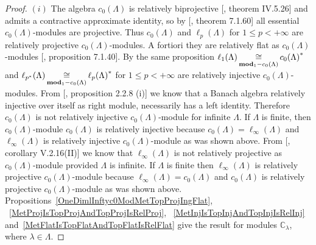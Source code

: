 \begin{proof} $(i)$ The algebra $c_0(\Lambda)$ is relatively biprojective
[\cite{HelHomolBanTopAlg}, theorem IV.5.26] and admits a contractive approximate
identity, so by [\cite{HelBanLocConvAlg}, theorem 7.1.60] all essential
$c_0(\Lambda)$-modules are projective. Thus $c_0(\Lambda)$ and $\ell_p(\Lambda)$
for $1\leq p<+\infty$ are relatively projective $c_0(\Lambda)$-modules. A
fortiori they are relatively flat as $c_0(\Lambda)$-modules
[\cite{HelBanLocConvAlg}, proposition 7.1.40]. By the same proposition
$\ell_1(\Lambda)\mathop{\mathbin{\cong}}\limits_{\mathbf{mod}_1-c_0(\Lambda)}{c_0(\Lambda)}^*$ and
$\ell_{p^*}(\Lambda)\mathop{\mathbin{\cong}}\limits_{\mathbf{mod}_1-c_0(\Lambda)}{\ell_p(\Lambda)}^*$ for
$1\leq p<+\infty$ are relatively injective $c_0(\Lambda)$-modules. From
[\cite{RamsHomPropSemgroupAlg}, proposition 2.2.8 (i)] we know that a Banach
algebra relatively injective over itself as right module, necessarily has a left
identity. Therefore $c_0(\Lambda)$ is not relatively injective
$c_0(\Lambda)$-module for infinite $\Lambda$. If $\Lambda$ is finite, then
$c_0(\Lambda)$-module $c_0(\Lambda)$ is relatively injective because
$c_0(\Lambda)=\ell_\infty(\Lambda)$ and $\ell_\infty(\Lambda)$ is relatively
injective $c_0(\Lambda)$-module as was shown above. From
[\cite{HelHomolBanTopAlg}, corollary V.2.16(II)] we know that
$\ell_\infty(\Lambda)$ is not relatively projective as $c_0(\Lambda)$-module
provided $\Lambda$ is infinite. If $\Lambda$ is finite then
$\ell_\infty(\Lambda)$ is relatively projective $c_0(\Lambda)$-module because
$\ell_\infty(\Lambda)=c_0(\Lambda)$ and $c_0(\Lambda)$ is relatively projective
$c_0(\Lambda)$-module as was shown above.
Propositions~\ref{OneDimlInftyc0ModMetTopProjIngFlat},
~\ref{MetProjIsTopProjAndTopProjIsRelProj},
~\ref{MetInjIsTopInjAndTopInjIsRelInj}
and~\ref{MetFlatIsTopFlatAndTopFlatIsRelFlat} give the result for modules
$\mathbb{C}_\lambda$, where $\lambda\in\Lambda$.


\end{proof}
